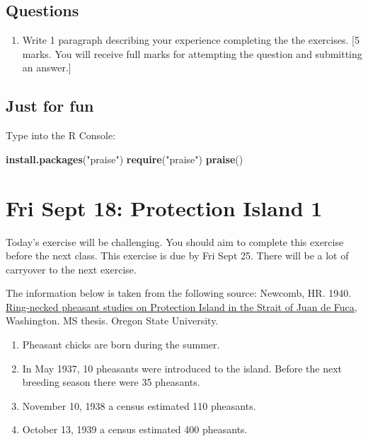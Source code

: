 \documentclass[]{book}
\newenvironment{Shaded}{\begin{snugshade}}{\end{snugshade}}
\newcommand{\KeywordTok}[1]{\textcolor[rgb]{0.13,0.29,0.53}{\textbf{{#1}}}}
\newcommand{\StringTok}[1]{\textcolor[rgb]{0.31,0.60,0.02}{{#1}}}
\newcommand{\NormalTok}[1]{{#1}}
\providecommand{\tightlist}{%
  \setlength{\itemsep}{0pt}\setlength{\parskip}{0pt}}
\begin{document}
\section{Questions}\label{questions}

\begin{enumerate}
\def\labelenumi{\arabic{enumi}.}
\tightlist
\item
  Write 1 paragraph describing your experience completing the the
  exercises. {[}5 marks. You will receive full marks for attempting the
  question and submitting an answer.{]}
\end{enumerate}

\section{Just for fun}\label{just-for-fun}

Type into the R Console:

\begin{Shaded}
\begin{Highlighting}[]
\KeywordTok{install.packages}\NormalTok{(}\StringTok{"praise"}\NormalTok{)}
\KeywordTok{require}\NormalTok{(}\StringTok{"praise"}\NormalTok{)}
\KeywordTok{praise}\NormalTok{()}
\end{Highlighting}
\end{Shaded}

\chapter{Fri Sept 18: Protection Island 1}\label{PE1}

Today's exercise will be challenging. You should aim to complete this
exercise before the next class. This exercise is due by Fri Sept 25.
There will be a lot of carryover to the next exercise.

The information below is taken from the following source: Newcomb, HR.
1940.
\href{https://ir.library.oregonstate.edu/concern/graduate_thesis_or_dissertations/js956j801?locale=en}{Ring-necked
pheasant studies on Protection Island in the Strait of Juan de Fuca},
Washington. MS thesis. Oregon State University.

\begin{enumerate}
\def\labelenumi{\alph{enumi}.}
\tightlist
\item
  Pheasant chicks are born during the summer.
\item
  In May 1937, 10 pheasants were introduced to the island. Before the
  next breeding season there were 35 pheasants.
\item
  November 10, 1938 a census estimated 110 pheasants.
\item
  October 13, 1939 a census estimated 400 pheasants.
\end{enumerate}
\end{document}
